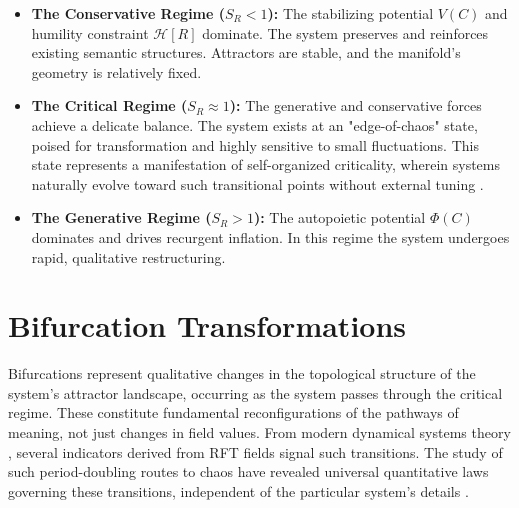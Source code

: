 \begin{itemize}

    \item \textbf{The Conservative Regime (\(S_R < 1\)):} The stabilizing potential \(V(C)\) and humility constraint \(\mathcal{H}[R]\) dominate. The system preserves and reinforces existing semantic structures. Attractors are stable, and the manifold's geometry is relatively fixed.

    \item \textbf{The Critical Regime (\(S_R \approx 1\)):} The generative and conservative forces achieve a delicate balance. The system exists at an "edge-of-chaos" state, poised for transformation and highly sensitive to small fluctuations. This state represents a manifestation of self-organized criticality, wherein systems naturally evolve toward such transitional points without external tuning \autocite{BakTangWiesenfeld1987, Kauffman1993}.

    \item \textbf{The Generative Regime (\(S_R > 1\)):} The autopoietic potential \(\Phi(C)\) dominates and drives recurgent inflation. In this regime the system undergoes rapid, qualitative restructuring.

\end{itemize}


\section{Bifurcation Transformations}
\label{11.3:bifurcation_transformations}

Bifurcations represent qualitative changes in the topological structure of the system's attractor landscape, occurring as the system passes through the critical regime. These constitute fundamental reconfigurations of the pathways of meaning, not just changes in field values. From modern dynamical systems theory \autocite{Poincare1892, Lorenz1963, Smale1967, RuelleTakens1971, GuckenheimerHolmes1983, Kuznetsov2004, Strogatz2014}, several indicators derived from RFT fields signal such transitions. The study of such period-doubling routes to chaos have revealed universal quantitative laws governing these transitions, independent of the particular system's details \autocite{Feigenbaum1978}.


